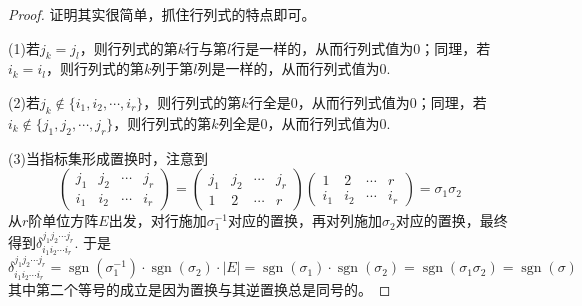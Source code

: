\begin{proof}
证明其实很简单，抓住行列式的特点即可。

(1)若$j_{k}=j_{l}$，则行列式的第$k$行与第$l$行是一样的，从而行列式值为0；同理，若$i_{k}=i_{l}$，则行列式的第$k$列于第$l$列是一样的，从而行列式值为0.

(2)若$j_{k}\notin \{i_{1},i_{2},\cdots,i_{r} \}$，则行列式的第$k$行全是0，从而行列式值为0；同理，若$i_{k}\notin \{j_{1},j_{2},\cdots,j_{r} \}$，则行列式的第$k$列全是0，从而行列式值为0.

(3)当指标集形成置换时，注意到
		\[
			\left(\begin{array}{llll}
					j_{1} & j_{2}  & \cdots & j_{r}  \\
					i_{1} & i_{2}  & \cdots & i_{r} 
			\end{array}\right)=
			\left(\begin{array}{llll}
				j_{1} & j_{2}  & \cdots & j_{r}  \\
				1 & 2  & \cdots & r 
			\end{array}\right)
			\left(\begin{array}{llll}
				1 & 2  & \cdots & r  \\
				i_{1} & i_{2}  & \cdots & i_{r} 
		\end{array}\right)=\sigma_{1}\sigma_{2}
		\]
从$r$阶单位方阵$E$出发，对行施加$\sigma_{1}^{-1}$对应的置换，再对列施加$\sigma_{2}$对应的置换，最终得到$\delta^{j_{1}j_{2}\cdots j_{r}}_{i_{1}i_{2}\cdots i_{r}}$. 于是
\[
	\delta^{j_{1}j_{2}\cdots j_{r}}_{i_{1}i_{2}\cdots i_{r}}=\operatorname{sgn}(\sigma_{1}^{-1})\cdot \operatorname{sgn}(\sigma_{2})\cdot |E|
	=\operatorname{sgn}(\sigma_{1})\cdot \operatorname{sgn}(\sigma_{2})=\operatorname{sgn}(\sigma_{1}\sigma_{2})=\operatorname{sgn}(\sigma)
\]
其中第二个等号的成立是因为置换与其逆置换总是同号的。
\end{proof}


